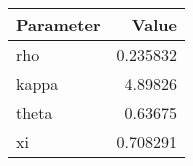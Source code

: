 \begin{tabular}{lr}
\hline
 Parameter   &    Value \\
\hline
 rho         & 0.235832 \\
 kappa       & 4.89826  \\
 theta       & 0.63675  \\
 xi          & 0.708291 \\
\hline
\end{tabular}
